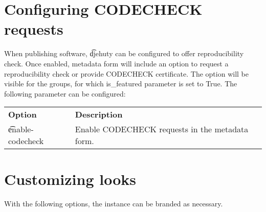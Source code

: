 \section{Configuring CODECHECK requests}

  When publishing software, \t{djehuty} can be configured to offer reproducibility check.
  Once enabled, metadata form will include an option to request a reproducibility check or provide CODECHECK certificate.
  The option will be visible for the groups, for which is_featured parameter is set to True.
  The following parameter can be configured:

\begin{tabularx}{\textwidth}{*{1}{!{\VRule[-1pt]}l}!{\VRule[-1pt]}X}
  \headrow
  \textbf{Option}             & \textbf{Description}\\
  \t{enable-codecheck}        & Enable CODECHECK requests in the metadata form.
\end{tabularx}

\section{Customizing looks}

  With the following options, the instance can be branded as necessary.


